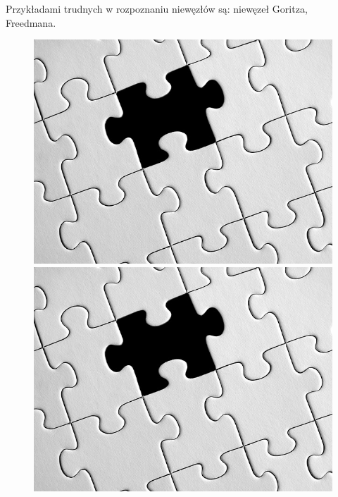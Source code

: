 
Przykładami trudnych w rozpoznaniu niewęzłów są: niewęzeł Goritza, Freedmana.

\begin{figure}[H]
	\begin{minipage}[b]{.32\linewidth}
		\centering
		\includegraphics[width=\linewidth]{../data/missing.jpg}
	\end{minipage}
	\begin{minipage}[b]{.32\linewidth}
		\centering
		\includegraphics[width=\linewidth]{../data/missing.jpg}
	\end{minipage}

\end{figure}
